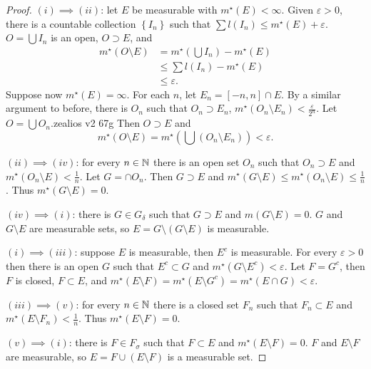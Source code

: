 \begin{proof}
	$(i) \implies (ii)$: let $E$ be measurable with $m^\star(E) < \infty$.
	Given $\varepsilon > 0$, there is a countable collection $\left\{
		I_n
	\right\}$ such that $\sum l(I_n) \leq m^\star(E) + \varepsilon$.
	$O = \bigcup I_n$ is an open, $O \supset E$, and
	\begin{align*}
		m^\star(O \setminus E)
		&= m^\star\left( 
			\bigcup I_n 
		\right) - m^\star(E) \\
		&\leq \sum l(I_n) - m^\star(E) \\
		&\leq \varepsilon.
	\end{align*}
	Suppose now $m^\star(E) = \infty$.
	For each $n$, let $E_n = [-n,n] \cap E$.
	By a similar argument to before, there is $O_n$ such that
	$O_n \supset E_n$, $m^\star(O_n \setminus E_n) < \frac{\varepsilon}{2^n}$.
	Let $O = \bigcup O_n$.zealios v2 67g
	Then $O \supset E$ and
	\[
		m^\star(O \setminus E)
		= m^\star\left( 
			 \bigcup(O_n \setminus E_n)
		\right)
		< \varepsilon.
	\]

	$(ii) \implies (iv)$: for every $n \in \mathbb{N}$ there is an open set $O_n$
	such that $O_n \supset E$ and $m^\star(O_n \setminus E) < \frac1n$.
	Let $G = \cap O_n$.
	Then $G \supset E$ and 
	$m^\star(G \setminus E) \leq m^\star(O_n \setminus E) \leq \frac{1}{n}$.
	Thus $m^\star(G \setminus E) = 0$.

	$(iv) \implies (i)$: there is $G \in G_\delta$ such that $G \supset E$
	and $m(G \setminus E) = 0$.
	$G$ and $G \setminus E$ are measurable sets, so
	$E = G \setminus (G \setminus E)$ is measurable.

	$(i) \implies (iii)$: suppose $E$ is measurable, then $E^c$ is measurable.
	For every $\varepsilon > 0$ then there is an open $G$ such that
	$E^c \subset G$ and $m^\star(G \setminus E^c) < \varepsilon$.
	Let $F = G^c$, then $F$ is closed,
	$F \subset E$, and
	$m^\star(E \setminus F) = m^\star(E \setminus G^c) = m^\star(E \cap G)
	< \varepsilon$.

	$(iii) \implies (v)$: for every $n \in \mathbb{N}$ there is a closed set $F_n$
	such that $F_n \subset E$ and $m^\star(E \setminus F_n) < \frac1n$.
	Thus $m^\star(E \setminus F) = 0$.

	$(v) \implies (i)$: there is $F \in F_\sigma$ such that $F \subset E$
	and $m^\star(E \setminus F) = 0$.
	$F$ and $E \setminus F$ are measurable, so $E = F \cup (E \setminus F)$
	is a measurable set.
\end{proof}

